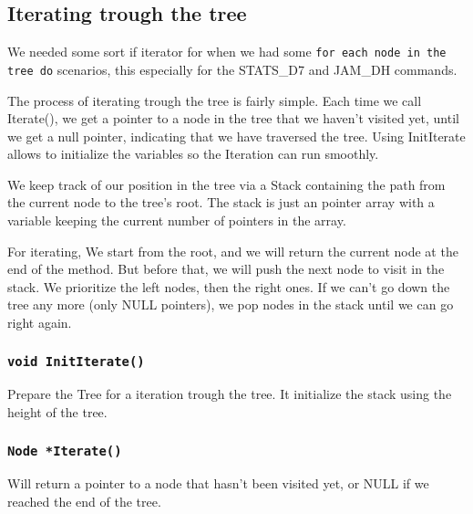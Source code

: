 \documentclass[10pt]{article}
\begin{document}
\subsection{Iterating trough the tree}

We needed some sort if iterator for when we had some \texttt{for each node in the tree do} scenarios, this especially for the STATS\_D7 and JAM\_DH commands.

The process of iterating trough the tree is fairly simple. Each time we call Iterate(), we get a pointer to a node in the tree that we haven’t visited yet, until we get a null pointer, indicating that we have traversed the tree. Using InitIterate allows to initialize the variables so the Iteration can run smoothly.

We keep track of our position in the tree via a Stack containing the path from the current node to the tree's root. The stack is just an pointer array with a variable keeping the current number of pointers in the array.

For iterating, We start from the root, and we will return the current node at the end of the method. But before that, we will push the next node to visit in the stack. We prioritize the left nodes, then the right ones. If we can't go down the tree any more (only NULL pointers), we pop nodes in the stack until we can go right again.

\subsubsection*{\tt void InitIterate()}
Prepare the Tree for a iteration trough the tree. It initialize the stack using the height of the tree.

\subsubsection*{\tt Node *Iterate()}
Will return a pointer to a node that hasn't been visited yet, or NULL if we reached the end of the tree.
 
\end{document}
